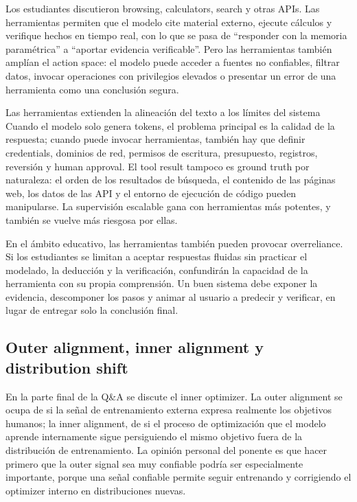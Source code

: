 \documentclass[a4paper]{article}
\begin{document}
Los estudiantes discutieron browsing, calculators, search y otras APIs. Las herramientas permiten que el modelo cite material externo, ejecute cálculos y verifique hechos en tiempo real, con lo que se pasa de ``responder con la memoria paramétrica'' a ``aportar evidencia verificable''. Pero las herramientas también amplían el action space: el modelo puede acceder a fuentes no confiables, filtrar datos, invocar operaciones con privilegios elevados o presentar un error de una herramienta como una conclusión segura.

\begin{knowledgebox}{Las herramientas extienden la alineación del texto a los límites del sistema}
Cuando el modelo solo genera tokens, el problema principal es la calidad de la respuesta; cuando puede invocar herramientas, también hay que definir credentials, dominios de red, permisos de escritura, presupuesto, registros, reversión y human approval. El tool result tampoco es ground truth por naturaleza: el orden de los resultados de búsqueda, el contenido de las páginas web, los datos de las API y el entorno de ejecución de código pueden manipularse. La supervisión escalable gana con herramientas más potentes, y también se vuelve más riesgosa por ellas.
\end{knowledgebox}

En el ámbito educativo, las herramientas también pueden provocar overreliance. Si los estudiantes se limitan a aceptar respuestas fluidas sin practicar el modelado, la deducción y la verificación, confundirán la capacidad de la herramienta con su propia comprensión. Un buen sistema debe exponer la evidencia, descomponer los pasos y animar al usuario a predecir y verificar, en lugar de entregar solo la conclusión final.

\subsection{Outer alignment, inner alignment y distribution shift}

En la parte final de la Q\&A se discute el inner optimizer. La outer alignment se ocupa de si la señal de entrenamiento externa expresa realmente los objetivos humanos; la inner alignment, de si el proceso de optimización que el modelo aprende internamente sigue persiguiendo el mismo objetivo fuera de la distribución de entrenamiento. La opinión personal del ponente es que hacer primero que la outer signal sea muy confiable podría ser especialmente importante, porque una señal confiable permite seguir entrenando y corrigiendo el optimizer interno en distribuciones nuevas.
\end{document}
